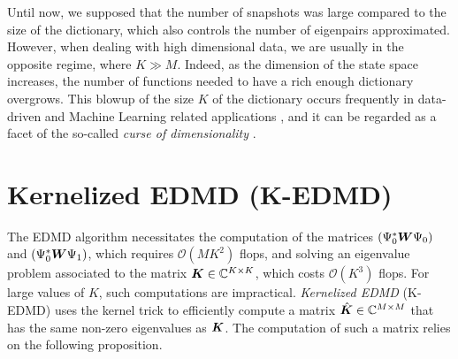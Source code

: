 Until now, we supposed that the number of snapshots was large compared to the size of the dictionary, which also controls the number of eigenpairs approximated. However, when dealing with high dimensional data, we are usually in the opposite regime, where $K \gg M$. Indeed, as the dimension of the state space increases, the number of functions needed to have a rich enough dictionary overgrows. This blowup of the size $K$ of the dictionary occurs frequently in data-driven and Machine Learning related applications \cite{budisic_applied_2012, rowley_spectral_2009, schmid_dynamic_2010}, and it can be regarded as a facet of the so-called \emph{curse of dimensionality} \cite{bishop_pattern_2006}. 

\section{Kernelized EDMD (K-EDMD)}
The EDMD algorithm necessitates the computation of the matrices $(\Psi_0^*\vb*{W}\Psi_0)$ and $(\Psi_0^*\vb*{W}\Psi_1)$, which requires $\mathcal{O}(MK^2)$ flops, and solving an eigenvalue problem associated to the matrix $\vb*{K}\in\mathbb{C}^{K\times K}$, which costs $\mathcal{O}(K^3)$ flops. For large values of $K$, such computations are impractical. \emph{Kernelized EDMD} (K-EDMD) \cite{williams_kernel-based_2015} uses the kernel trick \cite{bishop_pattern_2006} to efficiently compute a matrix $\hat{\vb*{K}}\in\mathbb{C}^{M\times M}$ that has the same non-zero eigenvalues as $\vb*{K}$. The computation of such a matrix relies on the following proposition.

